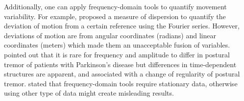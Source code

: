 %


Additionally, one can apply frequency-domain tools to quantify movement 
variability.
For example, \cite{hatze1986} proposed a measure of dispersion to 
quantify the deviation of motion from a certain reference using the 
Fourier series. However, deviations of motion are from angular coordinates 
(radians) and linear coordinates (meters) which made them an unacceptable 
fusion of variables. 
\cite{vaillancourt2001} pointed out that it is rare for frequency and 
amplitude to differ in postural tremor of patients with Parkinson's disease
but differences in time-dependent structures are apparent, and associated with 
a change of regularity of postural tremor.
\cite{klonowski2002, klonowski2007, klonowski2009} stated that 
frequency-domain tools require stationary data, otherwise using 
other type of data might create misleading results.

%

